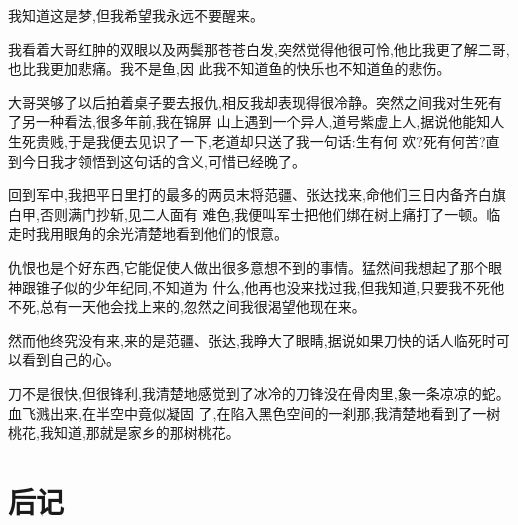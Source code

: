 ﻿\documentclass[12pt,twocolumn]{article}
\begin{document}
我知道这是梦,但我希望我永远不要醒来。

我看着大哥红肿的双眼以及两鬓那苍苍白发,突然觉得他很可怜,他比我更了解二哥,也比我更加悲痛。我不是鱼,因
此我不知道鱼的快乐也不知道鱼的悲伤。

大哥哭够了以后拍着桌子要去报仇,相反我却表现得很冷静。突然之间我对生死有了另一种看法,很多年前,我在锦屏
山上遇到一个异人,道号紫虚上人,据说他能知人生死贵贱,于是我便去见识了一下,老道却只送了我一句话:生有何
欢?死有何苦?直到今日我才领悟到这句话的含义,可惜已经晚了。

回到军中,我把平日里打的最多的两员末将范疆、张达找来,命他们三日内备齐白旗白甲,否则满门抄斩,见二人面有
难色,我便叫军士把他们绑在树上痛打了一顿。临走时我用眼角的余光清楚地看到他们的恨意。

仇恨也是个好东西,它能促使人做出很多意想不到的事情。猛然间我想起了那个眼神跟锥子似的少年纪同,不知道为
什么,他再也没来找过我,但我知道,只要我不死他不死,总有一天他会找上来的,忽然之间我很渴望他现在来。

然而他终究没有来,来的是范疆、张达,我睁大了眼睛,据说如果刀快的话人临死时可以看到自己的心。

刀不是很快,但很锋利,我清楚地感觉到了冰冷的刀锋没在骨肉里,象一条凉凉的蛇。血飞溅出来,在半空中竟似凝固
了,在陷入黑色空间的一刹那,我清楚地看到了一树桃花,我知道,那就是家乡的那树桃花。

\clearpage

\section{后记}
\end{document}
